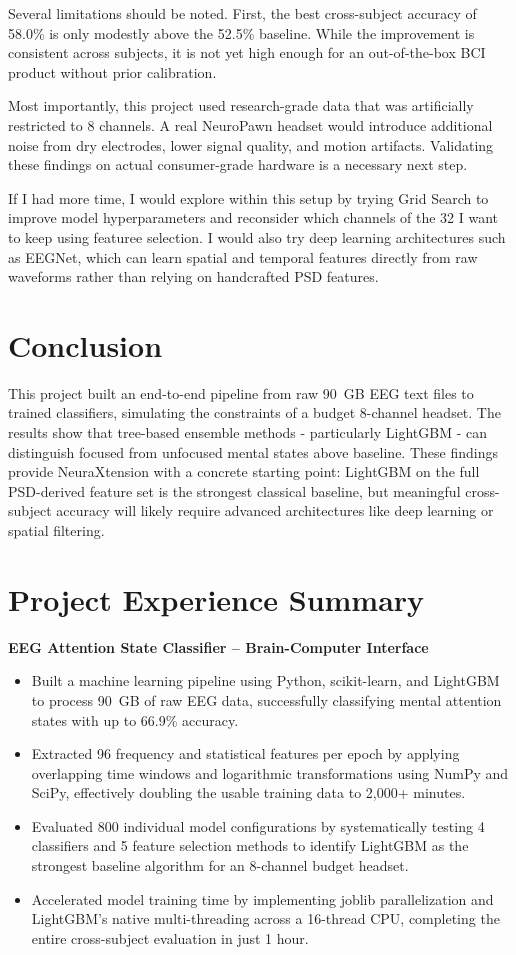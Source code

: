 \documentclass[12pt]{article}
\begin{document}
Several limitations should be noted. First, the best cross-subject accuracy of 58.0\% is only modestly above the 52.5\% baseline. While the improvement is consistent across subjects, it is not yet high enough for an out-of-the-box BCI product without prior calibration.

Most importantly, this project used research-grade data that was artificially restricted to 8 channels. A real NeuroPawn headset would introduce additional noise from dry electrodes, lower signal quality, and motion artifacts. Validating these findings on actual consumer-grade hardware is a necessary next step.

If I had more time, I would explore within this setup by trying Grid Search to improve model hyperparameters and reconsider which channels of the 32 I want to keep using featuree selection. I would also try deep learning architectures such as EEGNet, which can learn spatial and temporal features directly from raw waveforms rather than relying on handcrafted PSD features.

\section{Conclusion}

This project built an end-to-end pipeline from raw 90~GB EEG text files to trained classifiers, simulating the constraints of a budget 8-channel headset. The results show that tree-based ensemble methods - particularly LightGBM - can distinguish focused from unfocused mental states above baseline. These findings provide NeuraXtension with a concrete starting point: LightGBM on the full PSD-derived feature set is the strongest classical baseline, but meaningful cross-subject accuracy will likely require advanced architectures like deep learning or spatial filtering.

\newpage
\section*{Project Experience Summary}

\textbf{EEG Attention State Classifier -- Brain-Computer Interface}
\begin{itemize}
    \item Built a machine learning pipeline using Python, scikit-learn, and LightGBM to process 90~GB of raw EEG data, successfully classifying mental attention states with up to 66.9\% accuracy.
    \item Extracted 96 frequency and statistical features per epoch by applying overlapping time windows and logarithmic transformations using NumPy and SciPy, effectively doubling the usable training data to 2,000+ minutes.
    \item Evaluated 800 individual model configurations by systematically testing 4 classifiers and 5 feature selection methods to identify LightGBM as the strongest baseline algorithm for an 8-channel budget headset.
    \item Accelerated model training time by implementing joblib parallelization and LightGBM's native multi-threading across a 16-thread CPU, completing the entire cross-subject evaluation in just 1 hour.
\end{itemize}
\end{document}
